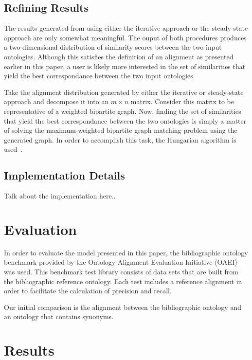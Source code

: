 \documentclass[letterpaper,twocolumn,12pt]{article}
\begin{document}
\subsection{Refining Results}

The results generated from using either the iterative approach or the steady-state approach are only somewhat meaningful.
The ouput of both procedures produces a two-dimensional distribution of similarity scores between the two input ontologies.
Although this satisfies the definition of an alignment as presented earlier in this paper, a user is likely more interested in the set of similarities that yield the best correspondance between the two input ontologies.

Take the alignment distribution generated by either the iterative or steady-state approach and decompose it into an $m \times n$ matrix.
Consider this matrix to be representative of a weighted bipartite graph.
Now, finding the set of similarities that yield the best correspondance between the two ontologies is simply a matter of solving the maximum-weighted bipartite graph matching problem using the generated graph.
In order to accomplish this task, the Hungarian algorithm is used~\cite{kuhn:1955:hungarian}.

\subsection{Implementation Details}

Talk about the implementation here..

\section{Evaluation}
\label{sec:eval}

In order to evaluate the model presented in this paper, the bibliographic ontology benchmark provided by the Ontology Alignment Evaluation Initiative (OAEI) was used.
This benchmark test library consists of data sets that are built from the bibliographic reference ontology.
Each test includes a reference alignment in order to facilitate the calculation of precision and recall.

Our initial comparison is the alignment between the bibliographic ontology and an ontology that contains synonyms.

\section{Results}
\label{sec:results}
\end{document}
